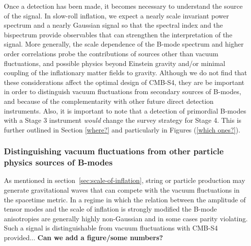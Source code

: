 Once a detection has been made, it becomes necessary to understand the source of the signal. In slow-roll inflation, we expect a nearly scale invariant power spectrum and a nearly Gaussian signal so that the spectral index and the bispectrum provide observables that can strengthen the interpretation of the signal. More generally, the scale dependence of the B-mode spectrum and higher order correlations probe the contributions of sources other than vacuum fluctuations, and possible physics beyond Einstein gravity and/or minimal coupling of the inflationary matter fields to gravity. Although we do not find that these considerations affect the optimal design of CMB-S4, they are be important in order to distinguish vacuum fluctuations from secondary sources of B-modes, and because of the complementarity with other future direct detection instruments. Also, it is important to note that a detection of primordial B-modes with a Stage 3 instrument {\it would} change the survey strategy for Stage 4. This is further outlined in Section \ref{where?} and particularly in Figures (\ref{which ones?}).


\subsubsection{Distinguishing vacuum fluctuations from other particle physics sources of B-modes}

As mentioned in section~\ref{sec:scale-of-inflation}, string or particle production may generate gravitational waves that can compete with the vacuum fluctuations in the spacetime metric. In a regime in which the relation between the amplitude of tensor modes and the scale of inflation is strongly modified the B-mode anisotropies are generally highly non-Gaussian and in some cases parity violating. Such a signal is distinguishable from vacuum fluctuations with CMB-S4 provided... {\bf Can we add a figure/some numbers?}\\

